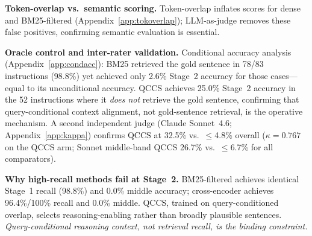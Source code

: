 \documentclass{article}
\begin{document}
\textbf{Token-overlap vs.\ semantic scoring.} Token-overlap inflates scores for
dense and BM25-filtered (Appendix~\ref{app:tokoverlap}); LLM-as-judge removes
these false positives, confirming semantic evaluation is essential.

\textbf{Oracle control and inter-rater validation.}
Conditional accuracy analysis (Appendix~\ref{app:condacc}): BM25 retrieved the
gold sentence in 78/83 instructions (98.8\%) yet achieved only 2.6\% Stage~2
accuracy for those cases---equal to its unconditional accuracy. QCCS achieves
25.0\% Stage~2 accuracy in the 52 instructions where it \emph{does not}
retrieve the gold sentence, confirming that query-conditional context alignment,
not gold-sentence retrieval, is the operative mechanism. A second independent judge (Claude Sonnet~4.6;
Appendix~\ref{app:kappa}) confirms QCCS at 32.5\%
vs.\ $\leq$4.8\% overall ($\kappa = 0.767$ on the QCCS arm; Sonnet
middle-band QCCS 26.7\% vs.\ $\leq$6.7\% for all comparators).

\textbf{Why high-recall methods fail at Stage~2.}
BM25-filtered achieves identical Stage~1 recall (98.8\%) and 0.0\% middle accuracy;
cross-encoder achieves 96.4\%/100\% recall and 0.0\% middle. QCCS, trained on
query-conditioned overlap, selects reasoning-enabling rather than broadly plausible
sentences. \emph{Query-conditional reasoning context, not retrieval recall, is the
binding constraint.}
\end{document}
